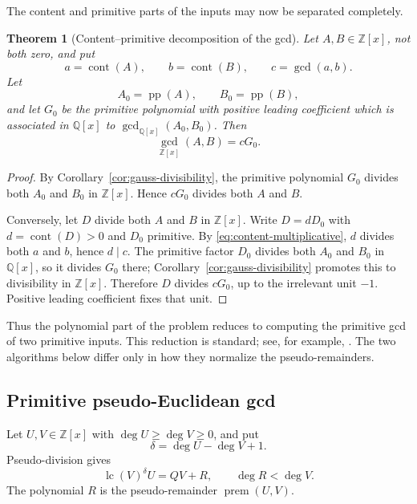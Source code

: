 \documentclass[11pt]{book}
\newtheorem{theorem}{Theorem}[section]
\theoremstyle{definition}
\newcommand{\ZZ}{\mathbb Z}
\begin{document}
The content and primitive parts of the inputs may now be separated completely.

\begin{theorem}[Content--primitive decomposition of the gcd]
\label{thm:gcd-content-primitive}
Let $A,B\in\ZZ[x]$, not both zero, and put
\[
 a=\operatorname{cont}(A),\qquad
 b=\operatorname{cont}(B),\qquad
 c=\gcd(a,b).
\]
Let
\[
 A_0=\operatorname{pp}(A),\qquad
 B_0=\operatorname{pp}(B),
\]
and let $G_0$ be the primitive polynomial with positive leading coefficient
which is associated in $\mathbb Q[x]$ to $\gcd_{\mathbb Q[x]}(A_0,B_0)$.
Then
\begin{equation}\label{eq:gcd-content-primitive}
 \gcd_{\ZZ[x]}(A,B)=cG_0.
\end{equation}
\end{theorem}

\begin{proof}
By Corollary~\ref{cor:gauss-divisibility}, the primitive polynomial $G_0$
divides both $A_0$ and $B_0$ in $\ZZ[x]$.  Hence $cG_0$ divides both $A$ and
$B$.

Conversely, let $D$ divide both $A$ and $B$ in $\ZZ[x]$.  Write
$D=dD_0$ with $d=\operatorname{cont}(D)>0$ and $D_0$ primitive.  By
\eqref{eq:content-multiplicative}, $d$ divides both $a$ and $b$, hence $d\mid c$.
The primitive factor $D_0$ divides both $A_0$ and $B_0$ in $\mathbb Q[x]$, so
it divides $G_0$ there; Corollary~\ref{cor:gauss-divisibility} promotes this to
divisibility in $\ZZ[x]$.  Therefore $D$ divides $cG_0$, up to the irrelevant
unit $-1$.  Positive leading coefficient fixes that unit.
\end{proof}

Thus the polynomial part of the problem reduces to computing the primitive gcd
of two primitive inputs.  This reduction is standard; see, for example,
\cite{vonZurGathenGerhard2013}.  The two algorithms below differ only in how
they normalize the pseudo-remainders.

\subsection{Primitive pseudo-Euclidean gcd}\label{subsec:primitive-gcd}

Let $U,V\in\ZZ[x]$ with $\deg U\ge\deg V\ge0$, and put
\[
 \delta=\deg U-\deg V+1.
\]
Pseudo-division gives
\begin{equation}\label{eq:gcd-pseudorem-identity}
 \operatorname{lc}(V)^\delta U=QV+R,
 \qquad \deg R<\deg V.
\end{equation}
The polynomial $R$ is the pseudo-remainder $\operatorname{prem}(U,V)$.
\end{document}
